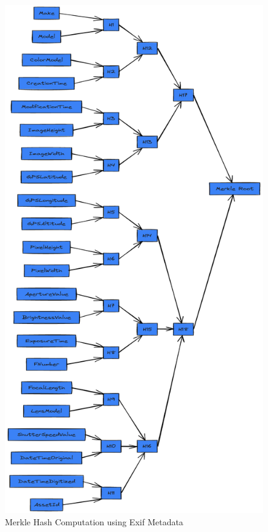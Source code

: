 

\begin{figure}[ht!]
    \centering
    \includegraphics[scale=0.245]{./images/merkleHashComputation.png}
    \caption{Merkle Hash Computation using Exif Metadata}
\end{figure}


